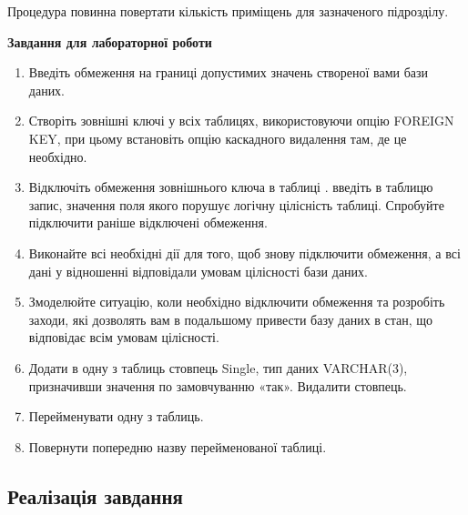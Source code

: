 \documentclass[a4paper,12pt]{article}
\begin{document}
	Процедура повинна повертати кількість приміщень для зазначеного підрозділу. \\
	\begin{center}
		\textbf{Завдання для лабораторної роботи}
	\end{center}
	\begin{enumerate}
		\item Введіть обмеження на границі допустимих значень створеної вами бази даних.
		\item Створіть зовнішні ключі у всіх таблицях, використовуючи опцію FOREIGN KEY, при цьому встановіть опцію каскадного видалення там, де це необхідно.
		\item Відключіть обмеження зовнішнього ключа в таблиці . введіть в таблицю запис, значення поля якого порушує логічну цілісність таблиці. Спробуйте підключити раніше відключені обмеження.
		\item Виконайте всі необхідні дії для того, щоб знову підключити обмеження, а всі дані у відношенні відповідали умовам цілісності бази даних.
\newpage
		\item Змоделюйте ситуацію, коли необхідно відключити обмеження та розробіть заходи, які дозволять вам в подальшому привести базу даних в стан, що відповідає всім умовам цілісності.
		\item Додати в одну з таблиць стовпець Single, тип даних VARCHAR(3), призначивши значення по замовчуванню «так». Видалити стовпець.
		\item Перейменувати одну з таблиць.
		\item Повернути попередню назву перейменованої таблиці. 
	\end{enumerate}
	
	
	\begin{center}
		\section*{\bfseries{Реалізація завдання}}
	\end{center}
	
\end{document}
